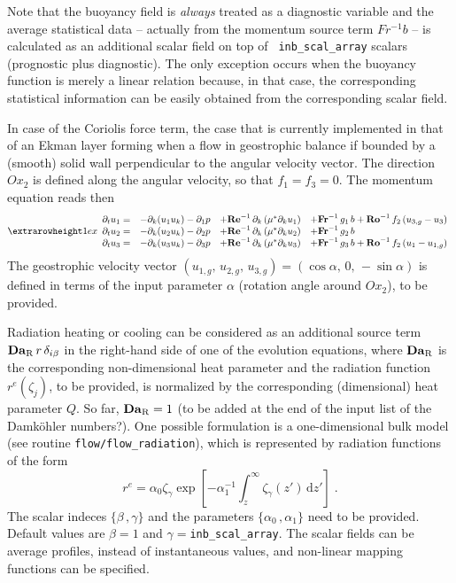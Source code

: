 Note that the buoyancy field is {\it always} treated as a diagnostic variable
and the average statistical data -- actually from the momentum source term
$Fr^{-1}b$ -- is calculated as an additional scalar field on top of {\tt
  inb\_scal\_array} scalars (prognostic plus diagnostic). The only exception
occurs when the buoyancy function is merely a linear relation because, in that
case, the corresponding statistical information can be easily obtained from the
corresponding scalar field.

In case of the Coriolis force term, the case that is currently implemented in
that of an Ekman layer forming when a flow in geostrophic balance if bounded by
a (smooth) solid wall perpendicular to the angular velocity vector. The
direction $Ox_2$ is defined along the angular velocity, so that $f_1=f_3=0$. The
momentum equation reads then
\begin{equation}
\setlength{\extrarowheight}{1ex}
\begin{array}{rlll}
  \partial_t  u_1 =& 
  -\partial_k ( u_1 u_k ) -\partial_1 p &
  +\mathrm{\bf Re}^{-1}\,\partial_k  \left( \mu^{*} \partial_k u_1\right) &
  +\mathrm{\bf Fr}^{-1}\, g_1\,b+\mathrm{\bf Ro}^{-1}\,f_2\,(u_{3,g}-u_3) \\
  \partial_t  u_2 =& 
  -\partial_k ( u_2 u_k ) -\partial_2 p &
  +\mathrm{\bf Re}^{-1}\,\partial_k  \left( \mu^{*} \partial_k u_2\right) &
  +\mathrm{\bf Fr}^{-1}\, g_2\,b \\
  \partial_t  u_3 =& 
  -\partial_k ( u_3 u_k ) -\partial_3 p &
  +\mathrm{\bf Re}^{-1}\,\partial_k  \left( \mu^{*} \partial_k u_3\right) &
  +\mathrm{\bf Fr}^{-1}\, g_3\,b+\mathrm{\bf Ro}^{-1}\,f_2\,(u_1-u_{1,g}) 
\end{array}
\end{equation}
The geostrophic velocity vector $(u_{1,g},\,u_{2,g},\,u_{3,g}) =
(\cos\alpha,\,0,\,-\sin\alpha)$ is defined in terms of the input parameter
$\alpha$ (rotation angle around $Ox_2$), to be provided.

Radiation heating or cooling can be considered as an additional source term
$\mathrm{\bf Da}_\mathrm{R}\,r\,\delta_{i\beta}$ in the right-hand side of one
of the evolution equations, where $\mathrm{\bf Da}_\mathrm{R}$ is the
corresponding non-dimensional heat parameter and the radiation function
$r^e(\zeta_j)$, to be provided, is normalized by the corresponding (dimensional)
heat parameter $Q$. So far, $\mathrm{\bf Da}_\mathrm{R}=1$ (to be added at the
end of the input list of the Damk{\"o}hler numbers?). One possible formulation
is a one-dimensional bulk model (see routine {\tt flow/flow\_radiation}), which
is represented by radiation functions of the form
\begin{equation}
r^e=\alpha_0 \zeta_{\gamma}\exp\left[
-\alpha_1^{-1}\int_z^\infty\zeta_{\gamma}(z')\,\mathrm{d}z'\right] \;.
\end{equation}
The scalar indeces $\{\beta\,,\gamma\}$ and the parameters $\{\alpha_0\,,\alpha_1\}$ need to be
provided. Default values are $\beta=1$ and $\gamma=${\tt inb\_scal\_array}. The scalar fields can be average profiles,
instead of instantaneous values, and non-linear mapping functions can be
specified.
